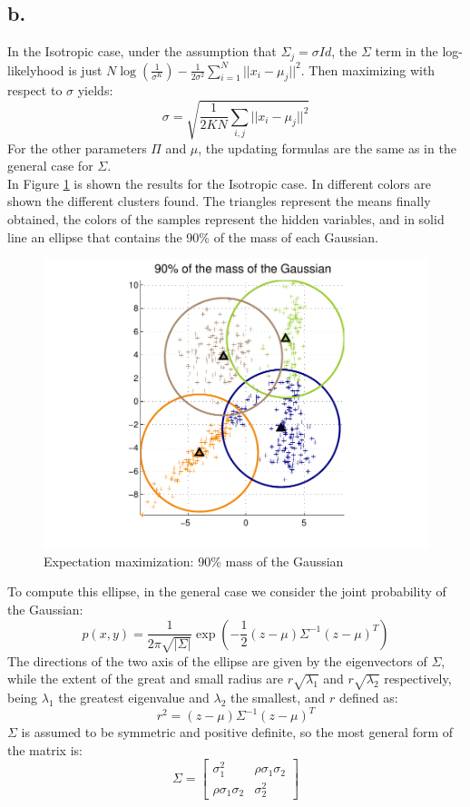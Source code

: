 \documentclass[12pt]{article}
\begin{document}
\subsection*{b.}
In the Isotropic case, under the assumption that $\Sigma_{j} = \sigma Id$, the $\Sigma$ term in the log-likelyhood is just $N \log(\frac{1}{\sigma^{K}})-\frac{1}{2\sigma^{2}} \sum \limits_{i=1}^N ||x_{i}-\mu_{j}||^{2}$. Then maximizing with respect to $\sigma$ yields:
$$\sigma=\sqrt{\frac{1}{2KN}\sum \limits_{i,j} ||x_{i}-\mu_{j}||^2}$$
For the other parameters $\Pi$ and $\mu$, the updating formulas are the same as in the general case for $\Sigma$.\\

In Figure \ref{fig:3b} is shown the results for the Isotropic case. In different colors are shown the different clusters found. The triangles represent the means finally obtained, the colors of the samples represent the hidden variables, and in solid line an ellipse that contains the 90\% of the mass of each Gaussian. 
\begin{figure}[h!]
	\centering 
	\includegraphics[width=.7\textwidth]{./pics/3b.pdf}
	\caption{Expectation maximization: 90\% mass of the Gaussian}
	\label{fig:3b}
\end{figure}
To compute this ellipse, in the general case we consider the joint probability of the Gaussian:
$$ p(x,y) = \frac{1}{2\pi \sqrt{|\Sigma|}}\exp \left(-\frac{1}{2}(z-\mu)\Sigma^{-1}(z-\mu)^T\right)$$
The directions of the two axis of the ellipse are given by the eigenvectors of $\Sigma$, while the extent of the great and small radius are $r\sqrt{\lambda_1}$ and $r\sqrt{\lambda_2}$ respectively, being $\lambda_1$ the greatest eigenvalue and $\lambda_2$ the smallest, and $r$ defined as: $$r^2=(z-\mu)\Sigma^{-1}(z-\mu)^T$$
$\Sigma$ is assumed to be symmetric and positive definite, so the most general form of the matrix is:
$$\Sigma = \left[
\begin{array}{cc}
\sigma_1^2 & \rho\sigma_1\sigma_2 \\ 
\rho\sigma_1\sigma_2 & \sigma_2^2
\end{array} 
\right]$$
\end{document}
